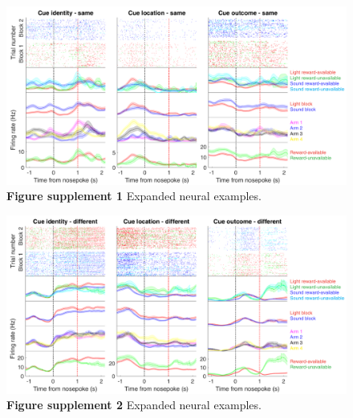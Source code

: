 \documentclass[11pt]{article}
\newcommand{\bsf}[1]{\textbf{#1}}
\providecommand{\DIFaddbeginFL}{} %
\providecommand{\DIFdelbeginFL}{} %
\providecommand{\DIFdelendFL}{} %
\newcommand{\DIFscaledelfig}{0.5}
\newlength{\DIFdelgraphicswidth} %
\newlength{\DIFdelgraphicsheight} %
\newcommand{\DIFaddincludegraphics}[2][]{{\color{blue}\fbox{\DIFOincludegraphics[#1]{#2}}}} %
\newcommand{\DIFdelincludegraphics}[2][]{%
\sbox{\DIFdelgraphicsbox}{\DIFOincludegraphics[#1]{#2}}%
\settoboxwidth{\DIFdelgraphicswidth}{\DIFdelgraphicsbox} %
\settoboxtotalheight{\DIFdelgraphicsheight}{\DIFdelgraphicsbox} %
\scalebox{\DIFscaledelfig}{%
\parbox[b]{\DIFdelgraphicswidth}{\usebox{\DIFdelgraphicsbox}\\[-\baselineskip] \rule{\DIFdelgraphicswidth}{0em}}\llap{\resizebox{\DIFdelgraphicswidth}{\DIFdelgraphicsheight}{%
\setlength{\unitlength}{\DIFdelgraphicswidth}%
\begin{picture}(1,1)%
\thicklines\linethickness{2pt} %
{\color[rgb]{1,0,0}\put(0,0){\framebox(1,1){}}}%
{\color[rgb]{1,0,0}\put(0,0){\line( 1,1){1}}}%
{\color[rgb]{1,0,0}\put(0,1){\line(1,-1){1}}}%
\end{picture}%
}\hspace*{3pt}}} %
} %
\DeclareRobustCommand{\DIFaddbeginFL}{\DIFOaddbeginFL \let\includegraphics\DIFaddincludegraphics} %
\DeclareRobustCommand{\DIFdelbeginFL}{\DIFOdelbeginFL \let\includegraphics\DIFdelincludegraphics} %
\DeclareRobustCommand{\DIFdelendFL}{\DIFOaddendFL \let\includegraphics\DIFOincludegraphics} %
\begin{document}
 \begin{figure}[ht!]
\centering
\DIFdelbeginFL %
\DIFdelendFL \DIFaddbeginFL \includegraphics[width=\textwidth]{Fig 8 - NP Neural examples SUPP1.pdf}
\caption*{\bsf{Figure supplement 1} Expanded neural examples.}
\label{fig:NP_examplesSUPP1}
\end{figure} \clearpage

 \begin{figure}[ht!]
\centering
\includegraphics[width=\textwidth]{Fig 8 - NP Neural examples SUPP2.pdf}
\caption*{\bsf{Figure supplement 2} Expanded neural examples.}
\label{fig:NP_examplesSUPP2}
\end{figure} \clearpage
\end{document}
